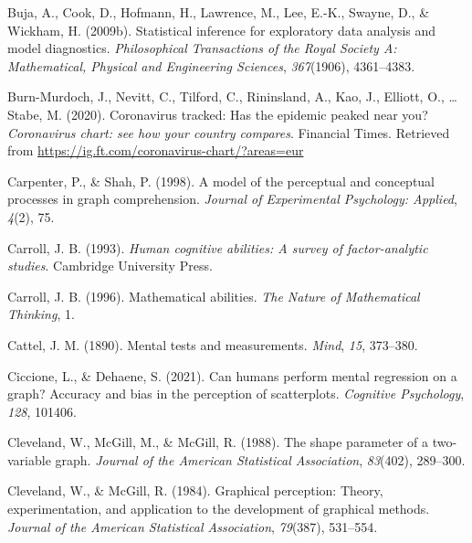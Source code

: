 \documentclass[print]{nuthesis}
\newlength{\cslhangindent}
\newenvironment{CSLReferences}[2]%
{\setlength{\parindent}{0pt}%
\everypar{\setlength{\hangindent}{\cslhangindent}}\ignorespaces}%
{\par}
\begin{document}
\begin{CSLReferences}{1}{0}
\leavevmode{}%
Buja, A., Cook, D., Hofmann, H., Lawrence, M., Lee, E.-K., Swayne, D., \& Wickham, H. (2009b). Statistical inference for exploratory data analysis and model diagnostics. \emph{Philosophical Transactions of the Royal Society A: Mathematical, Physical and Engineering Sciences}, \emph{367}(1906), 4361--4383.

\leavevmode{}%
Burn-Murdoch, J., Nevitt, C., Tilford, C., Rininsland, A., Kao, J., Elliott, O., \ldots{} Stabe, M. (2020). Coronavirus tracked: Has the epidemic peaked near you? \emph{Coronavirus chart: see how your country compares}. Financial Times. Retrieved from \url{https://ig.ft.com/coronavirus-chart/?areas=eur}

\leavevmode{}%
Carpenter, P., \& Shah, P. (1998). A model of the perceptual and conceptual processes in graph comprehension. \emph{Journal of Experimental Psychology: Applied}, \emph{4}(2), 75.

\leavevmode{}%
Carroll, J. B. (1993). \emph{Human cognitive abilities: A survey of factor-analytic studies}. Cambridge University Press.

\leavevmode{}%
Carroll, J. B. (1996). Mathematical abilities. \emph{The Nature of Mathematical Thinking}, 1.

\leavevmode{}%
Cattel, J. M. (1890). Mental tests and measurements. \emph{Mind}, \emph{15}, 373--380.

\leavevmode{}%
Ciccione, L., \& Dehaene, S. (2021). Can humans perform mental regression on a graph? Accuracy and bias in the perception of scatterplots. \emph{Cognitive Psychology}, \emph{128}, 101406.

\leavevmode{}%
Cleveland, W., McGill, M., \& McGill, R. (1988). The shape parameter of a two-variable graph. \emph{Journal of the American Statistical Association}, \emph{83}(402), 289--300.

\leavevmode{}%
Cleveland, W., \& McGill, R. (1984). Graphical perception: Theory, experimentation, and application to the development of graphical methods. \emph{Journal of the American Statistical Association}, \emph{79}(387), 531--554.


\end{CSLReferences}
\end{document}
